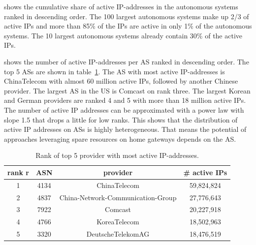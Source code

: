  shows the cumulative share of active IP-addresses in the autonomous systems ranked in descending order.
The 100 largest autonomous systems make up 2/3 of active IPs and more than 85\% of the IPs are active in only 1\% of the autonomous systems. The 10 largest autonomous systems already contain 30\% of the active IPs.

 shows the number of active IP-addresses per AS ranked in descending order.
The top 5 ASs are shown in table~\ref{tab:asrank}.
The AS with most active IP-addresses is ChinaTelecom with almost 60 million active IPs, followed by another Chinese provider.
The largest AS in the US is Comcast on rank three.
The largest Korean and German providers are ranked 4 and 5 with more than 18 million active IPs.
The number of active IP addresses can be approximated with a power law with slope 1.5 that drops a little for low ranks.
This shows that the distribution of active IP addresses on ASs is highly heterogeneous.
That means the potential of approaches leveraging spare resources on home gateways depends on the AS.

\begin{table}[tb]
\centering
\caption{Rank of top 5 provider with most active IP-addresses.}
\label{tab:asrank}
\begin{tabular}{|c|c|c|c|}
\hline
rank r & ASN & provider & \# active IPs  \\
\hline
1 & 4134 & ChinaTelecom & 59,824,824 \\
2 & 4837 & China-Network-Communication-Group & 27,776,643 \\
3 & 7922 & Comcast & 20,227,918 \\
4 & 4766 & KoreaTelecom & 18,502,963 \\
5 & 3320 & DeutscheTelekomAG & 18,476,519 \\
\hline
\end{tabular}
\end{table}
